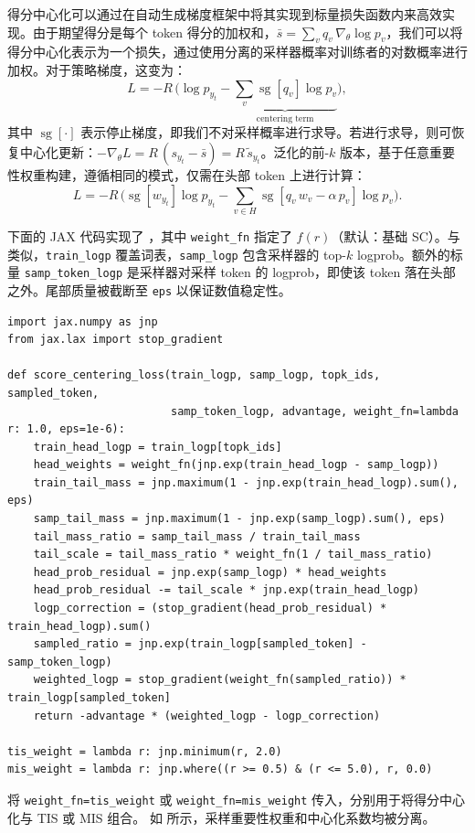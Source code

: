 得分中心化可以通过在自动生成梯度框架中将其实现到标量损失函数内来高效实现。由于期望得分是每个 token 得分的加权和，$\bar{s} = \sum_v q_v \, \nabla_\theta \log p_v$，我们可以将得分中心化表示为一个损失，通过使用分离的采样器概率对训练者的对数概率进行加权。对于策略梯度，这变为：
\begin{equation}
L = -R \, \Big( \log p_{y_t} - \underbrace{\sum_v \operatorname{sg}\left[ q_v \right] \log p_v}_{\text{centering term}} \Big),
\label{eq:sc_loss}
\end{equation}
其中 $\operatorname{sg}[\cdot]$ 表示停止梯度，即我们不对采样概率进行求导。若进行求导，则可恢复中心化更新：$-\nabla_\theta L = R \, (s_{y_t} - \bar{s}) = R \, \tilde{s}_{y_t}$。泛化的前-$k$ 版本，基于任意重要性权重构建，遵循相同的模式，仅需在头部 token 上进行计算：
\begin{equation}
L = -R \, \Big( \operatorname{sg}\left[ w_{y_t} \right] \log p_{y_t} - \sum_{v \in H} \operatorname{sg}\left[ q_v \, w_v - \alpha \, p_v \right] \log p_v \Big).
\label{eq:sc_loss_topk}
\end{equation}

下面的 JAX 代码实现了 ，其中 \texttt{weight\_fn} 指定了 $f(r)$（默认：基础 SC）。与  类似，\texttt{train\_logp} 覆盖词表，\texttt{samp\_logp} 包含采样器的 top-$k$ logprob。额外的标量 \texttt{samp\_token\_logp} 是采样器对采样 token 的 logprob，即使该 token 落在头部之外。尾部质量被截断至 \texttt{eps} 以保证数值稳定性。
\par\noindent
\begin{minipage}{\linewidth}
\begin{lstlisting}[style=python]
import jax.numpy as jnp
from jax.lax import stop_gradient

def score_centering_loss(train_logp, samp_logp, topk_ids, sampled_token,
                         samp_token_logp, advantage, weight_fn=lambda r: 1.0, eps=1e-6):
    train_head_logp = train_logp[topk_ids]
    head_weights = weight_fn(jnp.exp(train_head_logp - samp_logp))
    train_tail_mass = jnp.maximum(1 - jnp.exp(train_head_logp).sum(), eps)
    samp_tail_mass = jnp.maximum(1 - jnp.exp(samp_logp).sum(), eps)
    tail_mass_ratio = samp_tail_mass / train_tail_mass
    tail_scale = tail_mass_ratio * weight_fn(1 / tail_mass_ratio)
    head_prob_residual = jnp.exp(samp_logp) * head_weights
    head_prob_residual -= tail_scale * jnp.exp(train_head_logp)
    logp_correction = (stop_gradient(head_prob_residual) * train_head_logp).sum()
    sampled_ratio = jnp.exp(train_logp[sampled_token] - samp_token_logp)
    weighted_logp = stop_gradient(weight_fn(sampled_ratio)) * train_logp[sampled_token]
    return -advantage * (weighted_logp - logp_correction)

tis_weight = lambda r: jnp.minimum(r, 2.0)
mis_weight = lambda r: jnp.where((r >= 0.5) & (r <= 5.0), r, 0.0)
\end{lstlisting}
\end{minipage}
将 \texttt{weight\_fn=tis\_weight} 或 \texttt{weight\_fn=mis\_weight} 传入，分别用于将得分中心化与 TIS 或 MIS 组合。  
如  所示，采样重要性权重和中心化系数均被分离。


